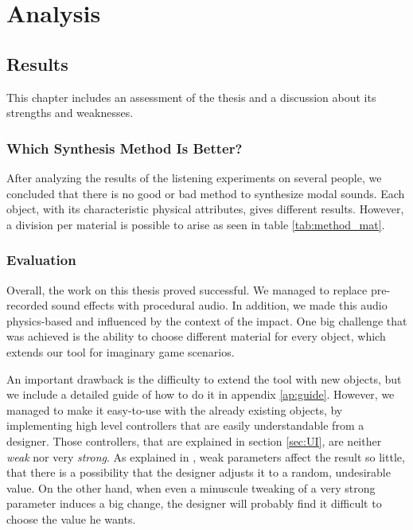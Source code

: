 \chapter{Analysis}\label{ch:analysis}

\section{Results}
This chapter includes an assessment of the thesis and a discussion about its strengths and weaknesses.  

\subsection{Which Synthesis Method Is Better?}
After analyzing the results of the listening experiments on several people, we concluded that there is no good or bad method to synthesize modal sounds. Each object, with its characteristic physical attributes, gives different results. However, a division per material is possible to arise as seen in table \ref{tab:method_mat}.

\subsection{Evaluation}

Overall, the work on this thesis proved successful. We managed to replace pre-recorded sound effects with procedural audio. In addition, we made this audio physics-based and influenced by the context of the impact. One big challenge that was achieved is the ability to choose different material for every object, which extends our tool for imaginary game scenarios. 

An important drawback is the difficulty to extend the tool with new objects, but we include a detailed guide of how to do it in appendix \ref{ap:guide}. However, we managed to make it easy-to-use with the already existing objects, by implementing high level controllers that are easily understandable from a designer. Those controllers, that are explained in section \ref{sec:UI}, are neither \textit{weak} nor very \textit{strong}. As explained in \cite{jaffe1995ten}, weak parameters affect the result so little, that there is a possibility that the designer adjusts it to a random, undesirable value. On the other hand, when even a minuscule tweaking of a very strong parameter induces a big change, the designer  will probably find it difficult to choose the value he wants.

